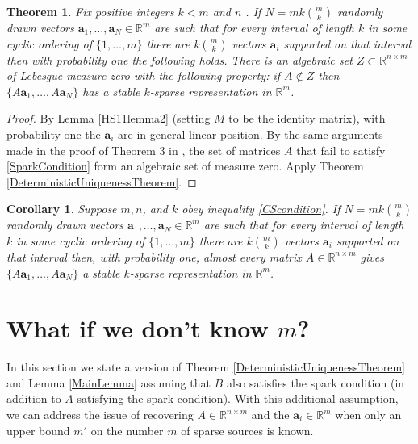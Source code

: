 \documentclass[journal, onecolumn]{IEEEtran}
\newtheorem{theorem}{Theorem}
\newtheorem{corollary}{Corollary}
\begin{document}
\begin{theorem}\label{Theorem3}
Fix positive integers $k < m$ and $n$ . If $N = mk{m \choose k}$ randomly drawn vectors $\mathbf{a}_1, \ldots, \mathbf{a}_N \in \mathbb{R}^m$ are such that for every interval of length $k$ in some cyclic ordering of $\{1, \ldots, m\}$ there are $k{m \choose k}$ vectors $\mathbf{a}_i$ supported on that interval then with probability one the following holds. There is an algebraic set $Z \subset \mathbb{R}^{n \times m}$ of Lebesgue measure zero with the following property: if $A \notin Z$ then $\{A\mathbf{a}_1, \ldots , A\mathbf{a}_N \}$ has a stable $k$-sparse representation in $\mathbb{R}^m$.
\end{theorem}

\begin{proof}
By Lemma \ref{HS11lemma2} (setting $M$ to be the identity matrix), with probability one the $\mathbf{a}_i$ are in general linear position. By the same arguments made in the proof of Theorem 3 in \cite{HS11}, the set of matrices $A$ that fail to satisfy \eqref{SparkCondition} form an algebraic set of measure zero. Apply Theorem \ref{DeterministicUniquenessTheorem}.
\end{proof}

\begin{corollary}
Suppose $m, n$, and $k$ obey inequality \eqref{CScondition}.  If $N = mk{m \choose k}$ randomly drawn vectors $\mathbf{a}_1, \ldots, \mathbf{a}_N \in \mathbb{R}^m$ are such that for every interval of length $k$ in some cyclic ordering of $\{1, \ldots, m\}$ there are $k{m \choose k}$ vectors $\mathbf{a}_i$ supported on that interval then, with probability one, almost every matrix $A \in \mathbb{R}^{n \times m}$ gives $\{A\mathbf{a}_1, \ldots , A\mathbf{a}_N \}$ a stable $k$-sparse representation in $\mathbb{R}^m$.
\end{corollary}


\section{What if we don't know $m$?}\label{mleqm}

In this section we state a version of Theorem \ref{DeterministicUniquenessTheorem} and Lemma \ref{MainLemma} assuming that $B$ also satisfies the spark condition (in addition to $A$ satisfying the spark condition). With this additional assumption, we can address the issue of recovering $A \in \mathbb{R}^{n \times m}$ and the $\mathbf{a}_i \in \mathbb{R}^m$ when only an upper bound $m'$ on the number $m$ of sparse sources is known.
\end{document}
